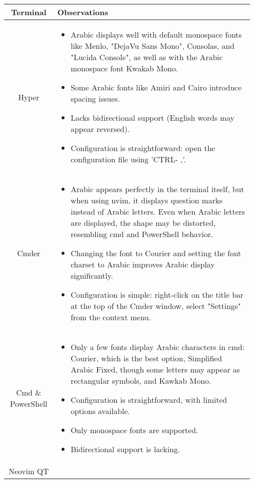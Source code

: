 \documentclass[12pt, letterpaper]{article}
\begin{document}
\begin{longtable}{|c|p{10cm}|}
    
    \hline
    \textbf{Terminal} & \textbf{Observations} \\
    \hline
    \centering Hyper &
    \begin{itemize}[leftmargin=*]
        \item Arabic displays well with default monospace fonts like Menlo, "DejaVu Sans Mono", Consolas, and "Lucida Console", as well as with the Arabic monospace font Kwakab Mono.
        \item Some Arabic fonts like Amiri and Cairo introduce spacing issues.
        \item Lacks bidirectional support (English words may appear reversed).
        \item Configuration is straightforward: open the configuration file using 'CTRL- ,'.
    \end{itemize} \\
    \hline
    \centering Cmder &
    \begin{itemize}
        \item Arabic appears perfectly in the terminal itself, but when using nvim, it displays question marks instead of Arabic letters. Even when Arabic letters are displayed, the shape may be distorted, resembling cmd and PowerShell behavior.
        \item Changing the font to Courier and setting the font charset to Arabic improves Arabic display significantly.
        \item Configuration is simple: right-click on the title bar at the top of the Cmder window, select "Settings" from the context menu.
    \end{itemize} \\
    \hline
    \centering Cmd \& PowerShell &
    \begin{itemize}
        \item Only a few fonts display Arabic characters in cmd: Courier, which is the best option, Simplified Arabic Fixed, though some letters may appear as rectangular symbols, and Kawkab Mono.
        \item Configuration is straightforward, with limited options available.
        \item Only monospace fonts are supported.
        \item Bidirectional support is lacking.
    \end{itemize} \\
    \hline
    Neovim QT &

\end{longtable}
\end{document}
